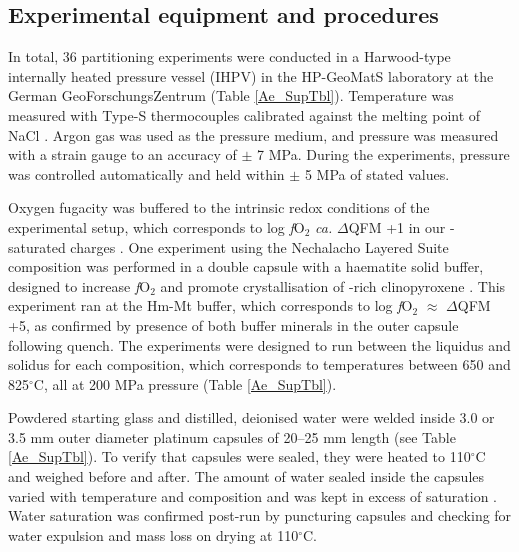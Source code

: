 \documentclass[final,authoryear,3p,times,twocolumn]{elsarticle}
\newcommand{\dgC}{$^\circ$C }
\newcommand{\dgCs}{$^\circ$C}
\newcommand{\fO}{\textit{f}O$_{2}$ }
\begin{document}
\subsection{Experimental equipment and procedures}

        In total, 36 partitioning experiments were conducted in a Harwood-type internally heated pressure vessel (IHPV) in the HP-GeoMatS laboratory at the German GeoForschungsZentrum (Table \ref{Ae_SupTbl}). Temperature was measured with Type-S thermocouples calibrated against the melting point of NaCl \citep[][accuracy of $\pm$ 5 \dgC at 200 MPa]{Borchert2010}. Argon gas was used as the pressure medium, and pressure was measured with a strain gauge to an accuracy of $\pm$ 7 MPa. During the experiments, pressure was controlled automatically and held within $\pm$ 5 MPa of stated values. 

Oxygen fugacity was buffered to the intrinsic redox conditions of the experimental setup, which corresponds to log \fO \emph{ca.} $\Delta$QFM +1 in our -saturated charges \cite[see][]{Chou1986,Berndt2002, Jugo2010}. One experiment using the Nechalacho Layered Suite composition was performed in a double capsule with a haematite solid buffer, designed to increase \fO and promote crystallisation of -rich clinopyroxene \citep{Eugster1962}. This experiment ran at the Hm-Mt buffer, which corresponds to log \fO $\approx$ $\Delta$QFM +5, as confirmed by presence of both buffer minerals in the outer capsule following quench. The experiments were designed to run between the liquidus and solidus for each composition, which corresponds to temperatures between 650 and 825\dgCs, all at 200 MPa pressure (Table \ref{Ae_SupTbl}).

Powdered starting glass and distilled, deionised water were welded inside 3.0 or 3.5 mm outer diameter platinum capsules of 20--25 mm length (see Table \ref{Ae_SupTbl}). To verify that capsules were sealed, they were heated to 110\dgC and weighed before and after. The amount of water sealed inside the capsules varied with temperature and composition and was kept in excess of saturation \citep{Carroll1997, Moore1998, Schmidt2008}. Water saturation was confirmed post-run by puncturing capsules and checking for water expulsion and mass loss on drying at 110\dgCs.
\end{document}
